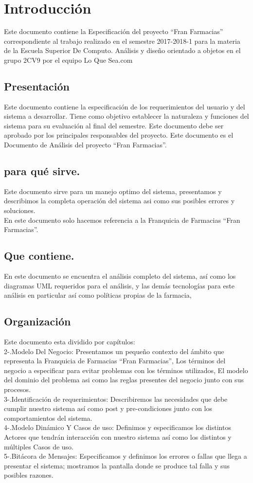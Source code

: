 \chapter{Introducción}
Este documento contiene la Especificación del proyecto “Fran Farmacias” correspondiente al trabajo realizado en el
semestre 2017-2018-1 para la materia de la Escuela Superior De Computo. Análisis y diseño orientado a objetos en el
grupo 2CV9 por el equipo Lo Que Sea.com

\section{Presentación}

Este documento contiene la especificación de los requerimientos del usuario y del sistema a desarrollar.
Tiene como objetivo establecer la naturaleza y funciones del sistema para su evaluación al final del semestre. 
Este documento debe ser aprobado por los principales responsables del proyecto.
Este documento es el Documento de Análisis del proyecto “Fran Farmacias”.

\section{para qué sirve.}
Este documento sirve para un manejo optimo del sistema, presentamos y describimos la completa operación del sistema asi como sus posibles errores y soluciones.\\
En este documento solo hacemos referencia a la Franquicia de Farmacias “Fran Farmacias”.
\section{Que contiene.}
En este documento se encuentra el análisis completo del sistema, así como los diagramas UML requeridos para el análisis, y las demás tecnologías para este análisis en particular así como políticas propias de la farmacia,
\section{Organización}
Este documento esta dividido por capítulos:\\
2-.Modelo Del Negocio: Presentamos un pequeño contexto del ámbito que representa la Franquicia de Farmacias ``Fran Farmacias'', Los términos del negocio a especificar para evitar problemas con los términos utilizados, El modelo del dominio del problema asi como las reglas presentes del negocio junto con sus procesos.\\
3-.Identificación de requerimientos: Describiremos las necesidades que debe cumplir nuestro sistema así como post y pre-condiciones junto con los comportamientos del sistema.\\
4-.Modelo Dinámico Y Casos de uso: Definimos y especificamos los distintos Actores que tendrán interacción con nuestro sistema así como los distintos y múltiples Casos de uso.\\
5-.Bitácora de Mensajes: Especificamos y definimos los errores o fallas que llega a presentar el sistema; mostramos la pantalla donde se produce tal falla y sus posibles razones.\\ 

